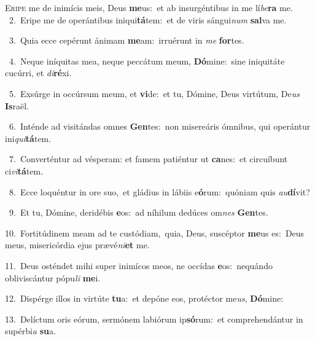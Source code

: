 \lettrine{\initial\textcolor{\initialcolor}{E}}{ripe} me de inimícis meis, Deus \textbf{me}\-us:~\star et ab insurgéntibus in me lí\-\textit{be}\-\textbf{ra} me.\\
{\numbfont\textcolor{\numbcolor}{~2.}}~Eripe me de operántibus iniqui\-\textbf{tá}\-tem:~\star et de viris sángui\textit{num} \textbf{sal}\-va me.\par
{\numbfont\textcolor{\numbcolor}{~3.}}~Quia ecce cepérunt ánimam \textbf{me}\-am:~\star irruérunt in \textit{me} \textbf{for}\-tes.\par
{\numbfont\textcolor{\numbcolor}{~4.}}~Neque iníquitas mea, neque peccátum meum, \textbf{Dó}\-mine:~\star sine iniquitáte cucúrri, et \textit{di}\-\textbf{ré}xi.\par
{\numbfont\textcolor{\numbcolor}{~5.}}~Exsúrge in occúrsum meum, et \textbf{vi}\-de:~\star et tu, Dómine, Deus virtútum, De\textit{us} \textbf{Is}\-raël.\par
{\numbfont\textcolor{\numbcolor}{~6.}}~Inténde ad visitándas omnes \textbf{Gen}\-tes:~\star non misereáris ómnibus, qui operántur ini\-\textit{qui}\-\textbf{tá}tem.\par
{\numbfont\textcolor{\numbcolor}{~7.}}~Converténtur ad vésperam: et famem patiéntur ut \textbf{ca}\-nes:~\star et circuíbunt ci\-\textit{vi}\-\textbf{tá}tem.\par
{\numbfont\textcolor{\numbcolor}{~8.}}~Ecce loquéntur in ore suo,~\dagger et gládius in lábiis e\-\textbf{ó}\-rum:~\star quóniam quis \textit{au}\-\textbf{dí}vit?\par
{\numbfont\textcolor{\numbcolor}{~9.}}~Et tu, Dómine, deridébis \textbf{e}\-os:~\star ad níhilum dedúces om\textit{nes} \textbf{Gen}\-tes.\par
{\numbfont\textcolor{\numbcolor}{10.}}~Fortitúdinem meam ad te custódiam,~\dagger quia, Deus, suscéptor \textbf{me}\-us es:~\star Deus meus, misericórdia ejus prævé\-\textit{ni}\-\textbf{et} me.\par
{\numbfont\textcolor{\numbcolor}{11.}}~Deus osténdet mihi super inimícos meos, ne occídas \textbf{e}\-os:~\star nequándo obliviscántur pópu\textit{li} \textbf{me}\-i.\par
{\numbfont\textcolor{\numbcolor}{12.}}~Dispérge illos in virtúte \textbf{tu}\-a:~\star et depóne eos, protéctor me\-\textit{us}\-, \textbf{Dó}\-mine:\par
{\numbfont\textcolor{\numbcolor}{13.}}~Delíctum oris eórum, sermónem labiórum ip\-\textbf{só}\-rum:~\star et comprehendántur in supérbi\textit{a} \textbf{su}\-a.\par
